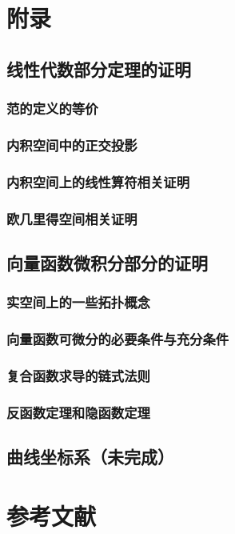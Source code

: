 \documentclass[zihao=-4,linespread=1.5,a4paper,heading=true,twoside]{ctexbook}
\theoremstyle{definition}
\theoremstyle{plain}
\begin{document}
\appendix
\newpage\part{附录}
\chapter{线性代数部分定理的证明}\label{sec:A}
\section{范的定义的等价}\label{sec:A.1}


\section{内积空间中的正交投影}\label{sec:A.2}


\section{内积空间上的线性算符相关证明}\label{sec:A.3}


\section{欧几里得空间相关证明}\label{sec:A.4}


\chapter{向量函数微积分部分的证明}\label{sec:B}
\section{实空间上的一些拓扑概念}\label{sec:B.1}


\section{向量函数可微分的必要条件与充分条件}\label{sec:B.2}


\section{复合函数求导的链式法则}\label{sec:B.3}


\section{反函数定理和隐函数定理}\label{sec:B.4}


%

\chapter{曲线坐标系（未完成）}\label{sec:C}
%


\newpage\part*{参考文献}
\printbibliography[heading=none]
\end{document}
